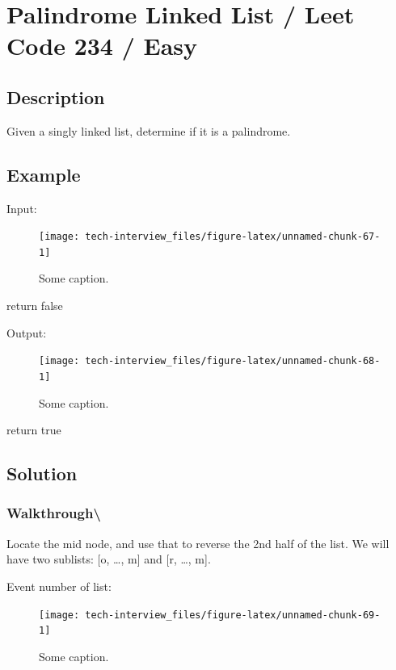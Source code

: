 \documentclass[]{book}
\begin{document}
\hypertarget{palindrome-linked-list-leet-code-234-easy}{%
\section{Palindrome Linked List / Leet Code 234 / Easy}\label{palindrome-linked-list-leet-code-234-easy}}

\hypertarget{description-95}{%
\subsection{Description}\label{description-95}}

Given a singly linked list, determine if it is a palindrome.

\hypertarget{example-91}{%
\subsection{Example}\label{example-91}}

Input:

\begin{figure}
\texttt{[image: tech-interview\_files/figure-latex/unnamed-chunk-67-1]} \caption{Some caption.}\label{fig:unnamed-chunk-67}
\end{figure}

return false

Output:

\begin{figure}
\texttt{[image: tech-interview\_files/figure-latex/unnamed-chunk-68-1]} \caption{Some caption.}\label{fig:unnamed-chunk-68}
\end{figure}

return true

\hypertarget{solution-66}{%
\subsection{Solution}\label{solution-66}}

\hypertarget{walkthrough-111}{%
\subsubsection{Walkthrough\textbackslash{}}\label{walkthrough-111}}

Locate the mid node, and use that to reverse the 2nd half of the list. We will have two sublists: {[}o, \ldots{}, m{]} and
{[}r, \ldots{}, m{]}.

Event number of list:

\begin{figure}
\texttt{[image: tech-interview\_files/figure-latex/unnamed-chunk-69-1]} \caption{Some caption.}\label{fig:unnamed-chunk-69}
\end{figure}
\end{document}
